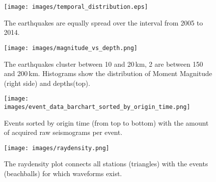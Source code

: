 
\begin{figure}[h]
\begin{center}
\texttt{[image: images/temporal\_distribution.eps]}
\caption{The earthquakes are equally spread over the interval from 2005 to 2014.}
\label{temp_dist}
\end{center}
\end{figure}

\begin{figure}[h]
\begin{center}
\texttt{[image: images/magnitude\_vs\_depth.png]}
\caption{The earthquakes cluster between 10 and 20\,km, 2 are between 150 and 200\,km. 
Histograms show the distribution of Moment Magnitude (right side) and depths(top).}
\label{depth_scatter}
\end{center}
\end{figure}

\begin{figure}[h]
\begin{center}
\texttt{[image: images/event\_data\_barchart\_sorted\_by\_origin\_time.png]}
\caption{Events sorted by origin time (from top to bottom) with the amount of acquired raw seismograms per event.}
\label{event_data}
\end{center}
\end{figure}


\begin{figure}[H]
\begin{center}
\texttt{[image: images/raydensity.png]}
\caption{The raydensity plot connects all stations (triangles) with the events (beachballs) for which waveforms exist.}
\label{raydens}
\end{center}
\end{figure}

